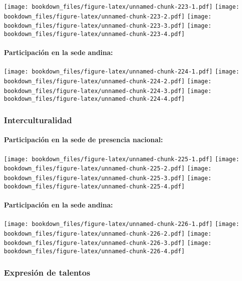 \documentclass[]{article}
\let\oldparagraph\paragraph
\renewcommand{\paragraph}[1]{\oldparagraph{#1}\mbox{}}
\theoremstyle{definition}
\theoremstyle{definition}
\theoremstyle{definition}
\theoremstyle{remark}
\begin{document}
\texttt{[image: bookdown\_files/figure-latex/unnamed-chunk-223-1.pdf]}
\texttt{[image: bookdown\_files/figure-latex/unnamed-chunk-223-2.pdf]}
\texttt{[image: bookdown\_files/figure-latex/unnamed-chunk-223-3.pdf]}
\texttt{[image: bookdown\_files/figure-latex/unnamed-chunk-223-4.pdf]}

\paragraph{Participación en la sede
andina:}\label{participacion-en-la-sede-andina-24}

\texttt{[image: bookdown\_files/figure-latex/unnamed-chunk-224-1.pdf]}
\texttt{[image: bookdown\_files/figure-latex/unnamed-chunk-224-2.pdf]}
\texttt{[image: bookdown\_files/figure-latex/unnamed-chunk-224-3.pdf]}
\texttt{[image: bookdown\_files/figure-latex/unnamed-chunk-224-4.pdf]}

\subsubsection{Interculturalidad}\label{interculturalidad-1}

\paragraph{Participación en la sede de presencia
nacional:}\label{participacion-en-la-sede-de-presencia-nacional-25}

\texttt{[image: bookdown\_files/figure-latex/unnamed-chunk-225-1.pdf]}
\texttt{[image: bookdown\_files/figure-latex/unnamed-chunk-225-2.pdf]}
\texttt{[image: bookdown\_files/figure-latex/unnamed-chunk-225-3.pdf]}
\texttt{[image: bookdown\_files/figure-latex/unnamed-chunk-225-4.pdf]}

\paragraph{Participación en la sede
andina:}\label{participacion-en-la-sede-andina-25}

\texttt{[image: bookdown\_files/figure-latex/unnamed-chunk-226-1.pdf]}
\texttt{[image: bookdown\_files/figure-latex/unnamed-chunk-226-2.pdf]}
\texttt{[image: bookdown\_files/figure-latex/unnamed-chunk-226-3.pdf]}
\texttt{[image: bookdown\_files/figure-latex/unnamed-chunk-226-4.pdf]}

\subsubsection{Expresión de talentos}\label{expresion-de-talentos-1}
\end{document}

